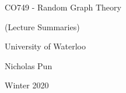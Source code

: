 \documentclass[12pt]{article}
\begin{document}
\begin{titlepage}
  \centering
  \vspace*{2in}
  {\huge CO749 - Random Graph Theory}\par
  {\Large (Lecture Summaries)}\par
  \vspace{0.3in}
  {\large University of Waterloo}\par
  {\large Nicholas Pun}\par
  {\large Winter 2020}\par 
 \end{titlepage}
 
\tableofcontents
\clearpage

\clearpage
\clearpage
\clearpage
\clearpage
\clearpage

\nocite{*}


\end{document}
